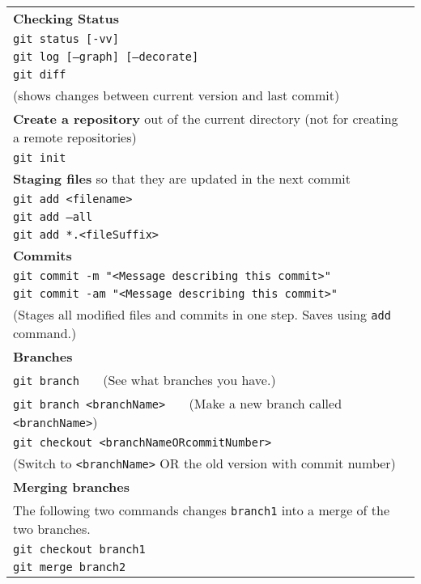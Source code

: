 \documentclass[11pt]{article}
\begin{document}
\begin{tabular}{|l|}
\hline
\textbf{Checking Status}\\
\quad \texttt{git status [-vv]}\\

\quad\texttt{git log [--graph] [--decorate]}\\

\quad \texttt{git diff}\\
\quad \quad(shows changes between current version and last commit)\\
\hline
\textbf{Create a repository} out of the current directory (not for creating a remote repositories)\\
\quad \texttt{git init}\\
\hline
\textbf{Staging files} so that they are updated in the next commit\\
\quad \texttt{git add <filename>}\\

\quad \texttt{git add --all}\\

\quad \texttt{git add *.<fileSuffix>}\\
\hline
\textbf{Commits}\\
 \quad \texttt{git commit -m "<Message describing this commit>"}\\

\quad \texttt{git commit -am "<Message describing this commit>"}\\
\quad \quad (Stages all modified files and commits in one step.  Saves using \texttt{add} command.)\\

\hline
\textbf{Branches}\\

\quad \texttt{git branch}  \ \ \ (See what branches you have.)\\ 

\quad \texttt{git branch <branchName>} \ \ \ (Make a new branch called \texttt{<branchName>})\\

\quad \texttt{git checkout <branchNameORcommitNumber>} \\
\quad \quad(Switch to \texttt{<branchName>} OR the old version with commit number)\\


\hline
\textbf{Merging branches}\\  The following two commands changes \texttt{branch1} into a merge of the two branches. \\
\quad \texttt{git checkout branch1}\\
\quad \texttt{git merge branch2}\\


\end{tabular}
\end{document}
